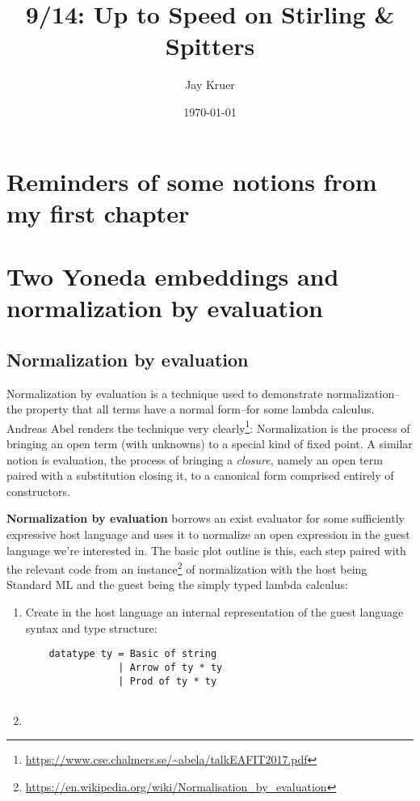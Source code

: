 \documentclass[11pt]{article}
\author{Jay Kruer}
\date{\today}
\title{9/14: Up to Speed on Stirling \& Spitters}
\begin{document}
\maketitle
\tableofcontents

\section{Reminders of some notions from my first chapter}
\label{sec:orgf58096a}

\section{Two Yoneda embeddings and normalization by evaluation}
\label{sec:org37b24cb}
\subsection{Normalization by evaluation}
\label{sec:org9943bee}
Normalization by evaluation is a technique used to demonstrate normalization--
the property that all terms have a normal form--for some lambda calculus.
Andreas Abel renders the technique very clearly\footnote{\url{https://www.cse.chalmers.se/\~abela/talkEAFIT2017.pdf}}: Normalization is the
process of bringing an open term (with unknowns) to a special kind of fixed
point. A similar notion is evaluation, the process of bringing a \emph{closure},
namely an open term paired with a substitution closing it, to a canonical form
comprised entirely of constructors.

\textbf{Normalization by evaluation} borrows an exist evaluator for some sufficiently
expressive host language and uses it to normalize an open expression in the
guest language we're interested in. The basic plot outline is this, each step
paired with the relevant code from an instance\footnote{\url{https://en.wikipedia.org/wiki/Normalisation\_by\_evaluation}} of normalization with the host
being Standard ML and the guest being the simply typed lambda calculus:
\begin{enumerate}
\item Create in the host language an internal representation of the guest language syntax and type structure:
\begin{verbatim}
    datatype ty = Basic of string
                | Arrow of ty * ty
                | Prod of ty * ty


\end{verbatim}
\item 
\end{enumerate}
\end{document}
